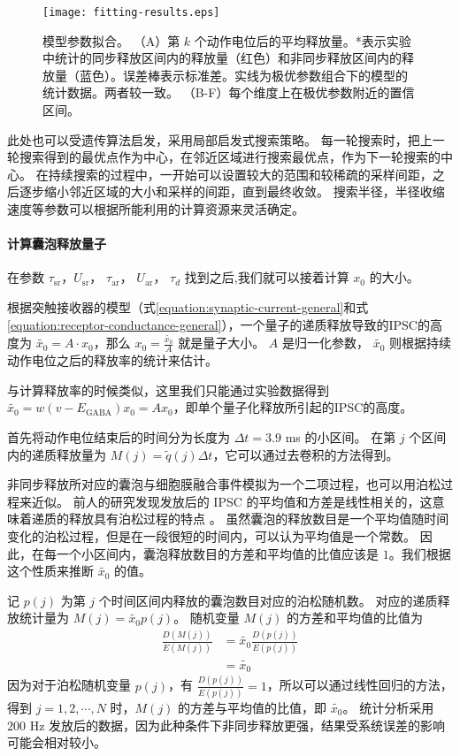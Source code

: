 \begin{figure}
\centering
\texttt{[image: fitting-results.eps]}
\caption{模型参数拟合。
（A）第 $k$ 个动作电位后的平均释放量。*表示实验中统计的同步释放区间内的释放量（红色）和非同步释放区间内的释放量（蓝色）。误差棒表示标准差。实线为极优参数组合下的模型的统计数据。两者较一致。
（B-F）每个维度上在极优参数附近的置信区间。}
\label{figure:fs-pc-fitting}
\end{figure}

此处也可以受遗传算法启发，采用局部启发式搜索策略。
每一轮搜索时，把上一轮搜索得到的最优点作为中心，在邻近区域进行搜索最优点，作为下一轮搜索的中心。
在持续搜索的过程中，一开始可以设置较大的范围和较稀疏的采样间距，之后逐步缩小邻近区域的大小和采样的间距，直到最终收敛。
搜索半径，半径收缩速度等参数可以根据所能利用的计算资源来灵活确定。

\paragraph{计算囊泡释放量子}
在参数 $\tau_\text{sr}$，$U_\text{sr}$， $\tau_\text{ar}$， $U_\text{ar}$， $\tau_d$ 找到之后,我们就可以接着计算 $x_0$ 的大小。

根据突触接收器的模型（式\ref{equation:synaptic-current-general}和式\ref{equation:receptor-conductance-general}），一个量子的递质释放导致的IPSC的高度为 $\tilde{x_0} = A \cdot x_0$，那么 $x_0 = \frac{\tilde{x_0}}{A}$ 就是量子大小。
$A$ 是归一化参数， $\tilde{x_0}$ 则根据持续动作电位之后的释放率的统计来估计。

与计算释放率的时候类似，这里我们只能通过实验数据得到 $\tilde{x_0} = w(v - E_\text{GABA}) x_0 = Ax_0$，即单个量子化释放所引起的IPSC的高度。

首先将动作电位结束后的时间分为长度为 $\Delta t = 3.9$ ms 的小区间。
在第 $j$ 个区间内的递质释放量为 $M(j) = \tilde{q}(j)\Delta t$，它可以通过去卷积的方法得到。

非同步释放所对应的囊泡与细胞膜融合事件模拟为一个二项过程，也可以用泊松过程来近似。
前人的研究发现发放后的 IPSC 的平均值和方差是线性相关的\cite{Hefft2005}，这意味着递质的释放具有泊松过程的特点 \cite{DELCASTILLO1954}。
虽然囊泡的释放数目是一个平均值随时间变化的泊松过程，但是在一段很短的时间内，可以认为平均值是一个常数。
因此，在每一个小区间内，囊泡释放数目的方差和平均值的比值应该是 $1$。我们根据这个性质来推断 $\tilde{x_0}$ 的值。

记 $p(j)$ 为第 $j$ 个时间区间内释放的囊泡数目对应的泊松随机数。
对应的递质释放统计量为 $M(j) = \tilde{x_0}p(j)$。
随机变量 $M(j)$ 的方差和平均值的比值为
\begin{equation}
\begin{split}
\frac{D\left( M(j) \right)}{E\left( M(j) \right)} &= \tilde{x_0}\frac{D\left( p(j) \right)}{E\left( p(j) \right)} \\
&= \tilde{x_0}
\end{split}
\label{equation:quantum-size}
\end{equation}
因为对于泊松随机变量 $p(j)$，有 $\frac{D\left( p(j) \right)}{E\left( p(j) \right)} = 1$，所以可以通过线性回归的方法，得到 $j = 1,2,\cdots,N$ 时，$M(j)$ 的方差与平均值的比值，即 $\tilde{x_0}$。
统计分析采用 $200$ Hz 发放后的数据，因为此种条件下非同步释放更强，结果受系统误差的影响可能会相对较小。

